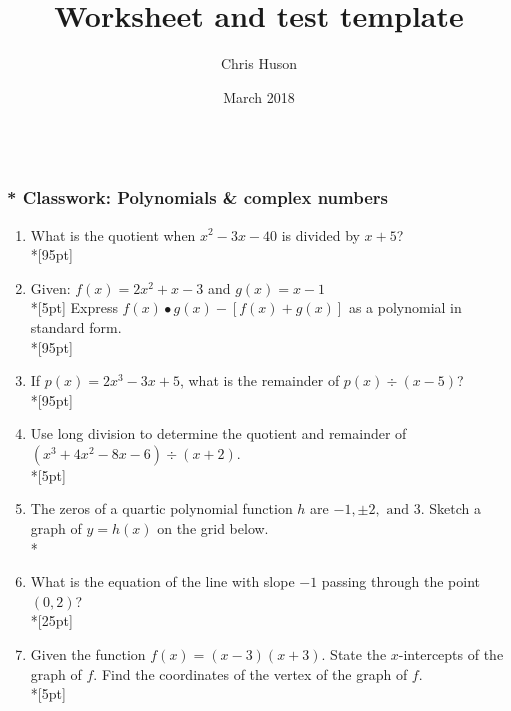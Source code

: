 \documentclass[12pt, oneside]{article}
\title{Worksheet and test template}
\author{Chris Huson}
\date{March 2018}
\begin{document}
\subsubsection*{\\* Classwork: Polynomials \& complex numbers}

\begin{enumerate}

\vspace{0.5 cm}


\item What is the quotient when $x^2-3x-40$ is divided by $x + 5$?\\*[95pt]

\item Given: $f(x)=2x^2+ x - 3$ and $g(x)=x-1$\\*[5pt]
Express $f(x) \bullet g(x) - [f(x) + g(x)]$ as a polynomial in standard form.\\*[95pt] %

\item If $p(x)=2x^3-3x+5$, what is the remainder of $p(x) \div (x-5)$? %
\\*[95pt]

\item Use long division to determine the quotient and remainder of $(x^3+4x^2-8x-6) \div (x+2)$.\\*[5pt]

\newpage

\item The zeros of a quartic polynomial function $h$ are  $-1,\pm 2, \text{ and } 3$. Sketch a graph of $y = h(x)$ on the grid below.\\*
\begin{center}
\end{center}

\item What is the equation of the line with slope $-1$ passing through the point $(0, 2)$?\\*[25pt]


\item Given the function $f(x)=(x-3)(x+3)$. State the $x$-intercepts of the graph of $f$. Find the coordinates of the vertex of the graph of $f$.\\*[5pt]


\newpage


\end{enumerate}
\end{document}
